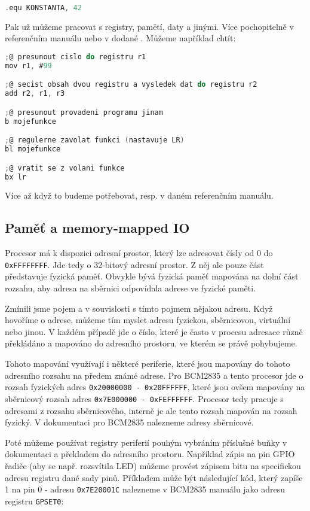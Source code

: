 \documentclass{article}
\begin{document}
\begin{lstlisting}[language=C]
.equ KONSTANTA, 42
\end{lstlisting}

Pak už můžeme pracovat s registry, pamětí, daty a jinými. Více pochopitelně v referenčním manuálu nebo v dodané . Můžeme například chtít:

\begin{lstlisting}[language=C]
;@ presunout cislo do registru r1
mov r1, #99

;@ secist obsah dvou registru a vysledek dat do registru r2
add r2, r1, r3

;@ presunout provadeni programu jinam
b mojefunkce

;@ regulerne zavolat funkci (nastavuje LR)
bl mojefunkce

;@ vratit se z volani funkce
bx lr
\end{lstlisting}

Více až když to budeme potřebovat, resp. v daném referenčním manuálu.

\subsection{Paměť a memory-mapped IO}

Procesor má k dispozici adresní prostor, který lze adresovat čísly od 0 do \texttt{0xFFFFFFFF}. Jde tedy o 32-bitový adresní prostor. Z něj ale pouze část představuje fyzická paměť. Obvykle bývá fyzická paměť mapována na dolní část rozsahu, aby adresa na sběrnici odpovídala adrese ve fyzické paměti.

Zmínili jsme pojem  a v souvislosti s tímto pojmem nějakou adresu. Když hovoříme o adrese, můžeme tím myslet adresu fyzickou, sběrnicovou, virtuální nebo jinou. V každém případě jde o číslo, které je často v procesu adresace různě překládáno a mapováno do adresního prostoru, ve kterém se právě pohybujeme.

Tohoto mapování využívají i některé periferie, které jsou mapovány do tohoto adresního rozsahu na předem známé adrese. Pro BCM2835 a tento procesor jde o rozsah fyzických adres \texttt{0x20000000 - 0x20FFFFFF}, které jsou ovšem mapovány na sběrnicový rozsah adres \texttt{0x7E000000 - 0xFEFFFFFF}. Procesor tedy pracuje s adresami z rozsahu sběrnicového, interně je ale tento rozsah mapován na rozsah fyzický. V dokumentaci pro BCM2835 nalezneme adresy sběrnicové.

Poté můžeme používat registry periferií pouhým vybráním příslušné buňky v dokumentaci a překladem do adresního prostoru. Například zápis na pin GPIO řadiče (aby se např. rozsvítila LED) můžeme provést zápisem bitu na specifickou adresu  registru dané sady pinů. Příkladem může být následující kód, který zapíše 1 na pin 0 - adresu \texttt{0x7E20001C} nalezneme v BCM2835 manuálu jako adresu registru \texttt{GPSET0}:
\end{document}
